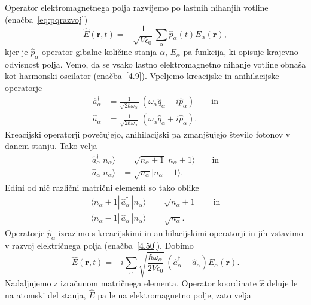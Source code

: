Operator elektromagnetnega polja razvijemo po lastnih nihanjih votline (enačba~\ref{eq:pqrazvoj}) 
\begin{equation}
\hat{E}(\mathbf{r},t)=-\frac{1}{\sqrt{V\epsilon_{0}}}\sum_{\alpha}
\hat{p}_{\alpha}(t)E_{\alpha}(\mathbf{r}),
\label{4.50}
\end{equation}
kjer je $\hat{p}_{\alpha}$ operator gibalne količine stanja $\alpha$, $E_{\alpha}$
pa funkcija, ki opisuje krajevno odvisnost polja. Vemo, da se vsako lastno
elektromagnetno nihanje votline obnaša kot harmonski oscilator (enačba~\ref{4.9}).
Vpeljemo kreacijske in anihilacijske operatorje
\begin{align}
\hat{a}_{\alpha}^{\dagger} & =  \frac{1}{\sqrt{2\hbar\omega_{\alpha}}}\,
(\omega_{\alpha}\hat{q}_{\alpha}-i\hat{p}_{\alpha}) \qquad \mathrm{in} \\
\hat{a}_{\alpha} & =  \frac{1}{\sqrt{2\hbar\omega_{\alpha}}}\,(\omega_{\alpha}\hat{q}_{\alpha}+i\hat{p}_{\alpha}).
\end{align}
 Kreacijski operatorji povečujejo, anihilacijski pa zmanjšujejo število
fotonov v danem stanju. Tako velja
\begin{align}
\hat{a}_{\alpha}^{\dagger}|n_{\alpha}\rangle & =  \sqrt{n_{\alpha}+1}
|n_{\alpha}+1\rangle\qquad \mathrm{in} \\
\hat{a}_{\alpha}|n_{\alpha}\rangle & =  \sqrt{n_{\alpha}}|n_{\alpha}-1\rangle.
\end{align}
Edini od nič različni matrični elementi so tako oblike
\begin{align}
\langle n_\alpha +1|\, \hat{a}_{\alpha}^{\dagger}\,|n_{\alpha}\rangle & = 
\sqrt{n_{\alpha}+1} \qquad \mathrm{in} \label{eq:ankr.1}\\
\langle n_\alpha-1|\,\hat{a}_{\alpha}\,|n_{\alpha}\rangle & =  \sqrt{n_{\alpha}}.
\label{eq:ankr}
\end{align}
Operatorje $\hat{p}_{\alpha}$ izrazimo s kreacijskimi in anihilacijskimi
operatorji in jih vstavimo v razvoj električnega polja (enačba~\ref{4.50}). Dobimo
\begin{equation}
\hat{E}(\mathbf{r},t)=-i\sum_{\alpha}\sqrt{\frac{\hbar\omega_{\alpha}}{2V\epsilon_{0}}}\,
\left(\hat{a}_{\alpha}^{\dagger}-\hat{a}_{\alpha}\right)E_{\alpha}(\mathbf{r}).
\label{4.53}
\end{equation}
Nadaljujemo z izračunom matričnega elementa. Operator koordinate
$\hat{x}$ deluje le na atomski del stanja, $\hat{E}$ pa le na elektromagnetno
polje, zato velja 
